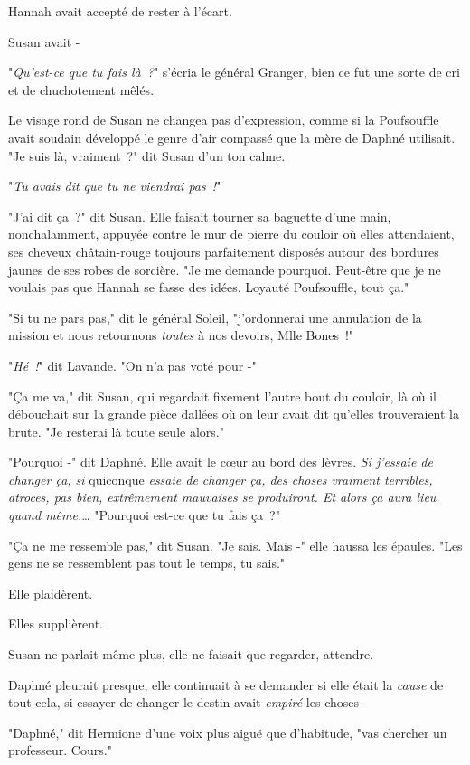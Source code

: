 Hannah avait accepté de rester à l'écart.

Susan avait -

\later

"\emph{Qu'est-ce que tu fais là~?}" s'écria le général Granger, bien ce fut une sorte de cri et de chuchotement mêlés.

Le visage rond de Susan ne changea pas d'expression, comme si la Poufsouffle avait soudain développé le genre d'air compassé que la mère de Daphné utilisait. "Je suis là, vraiment~?" dit Susan d'un ton calme.

"\emph{Tu avais dit que tu ne viendrai pas~!}"

"J'ai dit ça~?" dit Susan. Elle faisait tourner sa baguette d'une main, nonchalamment, appuyée contre le mur de pierre du couloir où elles attendaient, ses cheveux châtain-rouge toujours parfaitement disposés autour des bordures jaunes de ses robes de sorcière. "Je me demande pourquoi. Peut-être que je ne voulais pas que Hannah se fasse des idées. Loyauté Poufsouffle, tout ça."

"Si tu ne pars pas," dit le général Soleil, "j'ordonnerai une annulation de la mission et nous retournons \emph{toutes} à nos devoirs, Mlle Bones~!"

"\emph{Hé~!}" dit Lavande. "On n'a pas voté pour -"

"Ça me va," dit Susan, qui regardait fixement l'autre bout du couloir, là où il débouchait sur la grande pièce dallées où on leur avait dit qu'elles trouveraient la brute. "Je resterai là toute seule alors."

"Pourquoi -" dit Daphné. Elle avait le cœur au bord des lèvres. \emph{Si j'essaie de changer ça, si} quiconque \emph{essaie de changer ça, des choses vraiment terribles, atroces, pas bien, extrêmement mauvaises se produiront. Et alors ça aura lieu quand même.}… "Pourquoi est-ce que tu fais ça~?"

"Ça ne me ressemble pas," dit Susan. "Je sais. Mais -" elle haussa les épaules. "Les gens ne se ressemblent pas tout le temps, tu sais."

Elle plaidèrent.

Elles supplièrent.

Susan ne parlait même plus, elle ne faisait que regarder, attendre.

Daphné pleurait presque, elle continuait à se demander si elle était la \emph{cause} de tout cela, si essayer de changer le destin avait \emph{empiré} les choses -

"Daphné," dit Hermione d'une voix plus aiguë que d'habitude, "vas chercher un professeur. Cours."

